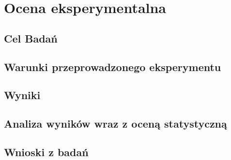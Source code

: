 \chapter{Ocena eksperymentalna}
\section{Cel Badań}
\section{Warunki przeprowadzonego eksperymentu}
\section{Wyniki}
\section{Analiza wyników wraz z oceną statystyczną}
\section{Wnioski z badań}

